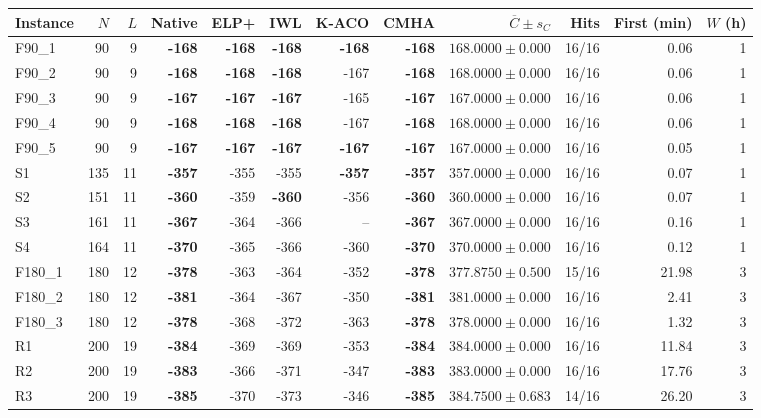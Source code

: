 \begin{tabular}{@{}lrrrrrrrrrrr@{}}
\toprule
Instance & $N$ & $L$ & Native & ELP+\cite{liu2013elp} & IWL\cite{liu2014iwl} & K-ACO\cite{doduc2018} & \textbf{CMHA} & $\overline C\pm s_C$ & Hits & First (min) & $W$ (h) \\
\midrule
F90\_1 & 90 & 9 & \textbf{-168} & \textbf{-168} & \textbf{-168} & \textbf{-168} & \textbf{-168} & $168.0000\pm0.000$ & 16/16 & 0.06 & 1 \\
F90\_2 & 90 & 9 & \textbf{-168} & \textbf{-168} & \textbf{-168} & -167 & \textbf{-168} & $168.0000\pm0.000$ & 16/16 & 0.06 & 1 \\
F90\_3 & 90 & 9 & \textbf{-167} & \textbf{-167} & \textbf{-167} & -165 & \textbf{-167} & $167.0000\pm0.000$ & 16/16 & 0.06 & 1 \\
F90\_4 & 90 & 9 & \textbf{-168} & \textbf{-168} & \textbf{-168} & -167 & \textbf{-168} & $168.0000\pm0.000$ & 16/16 & 0.06 & 1 \\
F90\_5 & 90 & 9 & \textbf{-167} & \textbf{-167} & \textbf{-167} & \textbf{-167} & \textbf{-167} & $167.0000\pm0.000$ & 16/16 & 0.05 & 1 \\
S1 & 135 & 11 & \textbf{-357} & -355 & -355 & \textbf{-357} & \textbf{-357} & $357.0000\pm0.000$ & 16/16 & 0.07 & 1 \\
S2 & 151 & 11 & \textbf{-360} & -359 & \textbf{-360} & -356 & \textbf{-360} & $360.0000\pm0.000$ & 16/16 & 0.07 & 1 \\
S3 & 161 & 11 & \textbf{-367} & -364 & -366 & -- & \textbf{-367} & $367.0000\pm0.000$ & 16/16 & 0.16 & 1 \\
S4 & 164 & 11 & \textbf{-370} & -365 & -366 & -360 & \textbf{-370} & $370.0000\pm0.000$ & 16/16 & 0.12 & 1 \\
F180\_1 & 180 & 12 & \textbf{-378} & -363 & -364 & -352 & \textbf{-378} & $377.8750\pm0.500$ & 15/16 & 21.98 & 3 \\
F180\_2 & 180 & 12 & \textbf{-381} & -364 & -367 & -350 & \textbf{-381} & $381.0000\pm0.000$ & 16/16 & 2.41 & 3 \\
F180\_3 & 180 & 12 & \textbf{-378} & -368 & -372 & -363 & \textbf{-378} & $378.0000\pm0.000$ & 16/16 & 1.32 & 3 \\
R1 & 200 & 19 & \textbf{-384} & -369 & -369 & -353 & \textbf{-384} & $384.0000\pm0.000$ & 16/16 & 11.84 & 3 \\
R2 & 200 & 19 & \textbf{-383} & -366 & -371 & -347 & \textbf{-383} & $383.0000\pm0.000$ & 16/16 & 17.76 & 3 \\
R3 & 200 & 19 & \textbf{-385} & -370 & -373 & -346 & \textbf{-385} & $384.7500\pm0.683$ & 14/16 & 26.20 & 3 \\

\end{tabular}
